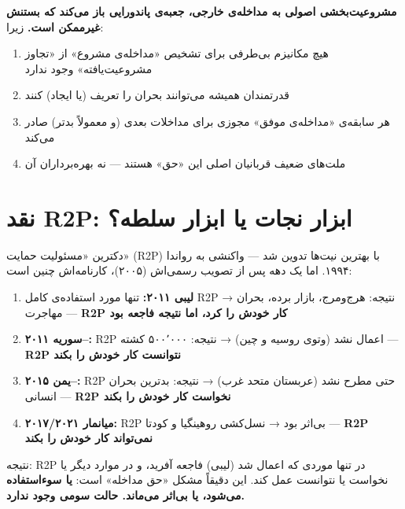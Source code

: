\begin{tcolorbox}[enemybox, title={تز اصلی این پیوست}]
\textbf{مشروعیت‌بخشی اصولی به مداخله‌ی خارجی، جعبه‌ی پاندورایی باز می‌کند که بستنش غیرممکن است.} زیرا:
\begin{enumerate}
\item هیچ مکانیزم بی‌طرفی برای تشخیص «مداخله‌ی مشروع» از «تجاوز مشروعیت‌یافته» وجود ندارد
\item قدرتمندان همیشه می‌توانند بحران را تعریف (یا ایجاد) کنند
\item هر سابقه‌ی «مداخله‌ی موفق» مجوزی برای مداخلات بعدی (و معمولاً بدتر) صادر می‌کند
\item ملت‌های ضعیف قربانیان اصلی این «حق» هستند — نه بهره‌برداران آن
\end{enumerate}
\end{tcolorbox}


\section{نقد R2P: ابزار نجات یا ابزار سلطه؟}
\label{sec:app-b-r2p-critique}

دکترین «مسئولیت حمایت» (R2P) با بهترین نیت‌ها تدوین شد — واکنشی به رواندا ۱۹۹۴. اما یک دهه پس از تصویب رسمی‌اش (۲۰۰۵)، کارنامه‌اش چنین است:

\begin{enumerate}
\item \textbf{لیبی ۲۰۱۱:} تنها مورد استفاده‌ی کامل R2P → نتیجه: هرج‌ومرج، بازار برده، بحران مهاجرت — \textbf{R2P کار خودش را کرد، اما نتیجه فاجعه بود}
\item \textbf{سوریه ۲۰۱۱–:} R2P اعمال نشد (وتوی روسیه و چین) → نتیجه: ۵۰۰٬۰۰۰ کشته — \textbf{R2P نتوانست کار خودش را بکند}
\item \textbf{یمن ۲۰۱۵–:} R2P حتی مطرح نشد (عربستان متحد غرب) → نتیجه: بدترین بحران انسانی — \textbf{R2P نخواست کار خودش را بکند}
\item \textbf{میانمار ۲۰۱۷/۲۰۲۱:} R2P بی‌اثر بود → نسل‌کشی روهینگیا و کودتا — \textbf{R2P نمی‌تواند کار خودش را بکند}
\end{enumerate}

نتیجه: R2P در تنها موردی که اعمال شد (لیبی) فاجعه آفرید، و در موارد دیگر یا نخواست یا نتوانست عمل کند. این دقیقاً مشکل «حق مداخله» است: \textbf{یا سوءاستفاده می‌شود، یا بی‌اثر می‌ماند. حالت سومی وجود ندارد.}


